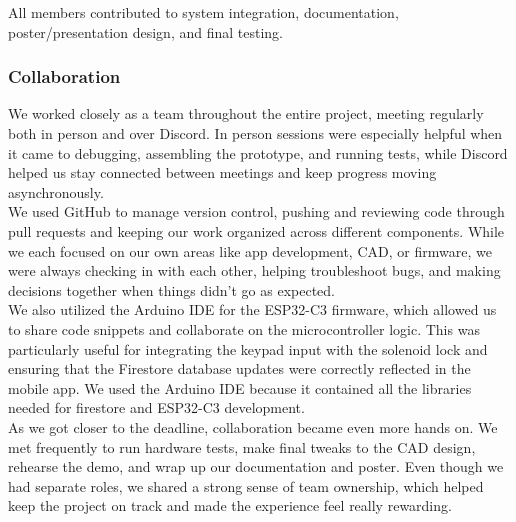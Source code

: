 All members contributed to system integration, documentation, poster/presentation design, and final testing.

\subsubsection{Collaboration}

We worked closely as a team throughout the entire project, meeting regularly both in person and over Discord. In person sessions were especially helpful when it came to debugging, assembling the prototype, and running tests, while Discord helped us stay connected between meetings and keep progress moving asynchronously. \\

We used GitHub to manage version control, pushing and reviewing code through pull requests and keeping our work organized across different components. While we each focused on our own areas like app development, CAD, or firmware, we were always checking in with each other, helping troubleshoot bugs, and making decisions together when things didn’t go as expected. \\

We also utilized the Arduino IDE for the ESP32-C3 firmware, which allowed us to share code snippets and collaborate on the microcontroller logic. This was particularly useful for integrating the keypad input with the solenoid lock and ensuring that the Firestore database updates were correctly reflected in the mobile app. We used the Arduino IDE because it contained all the libraries needed for firestore and ESP32-C3 development. \\

As we got closer to the deadline, collaboration became even more hands on. We met frequently to run hardware tests, make final tweaks to the CAD design, rehearse the demo, and wrap up our documentation and poster. Even though we had separate roles, we shared a strong sense of team ownership, which helped keep the project on track and made the experience feel really rewarding. \\
